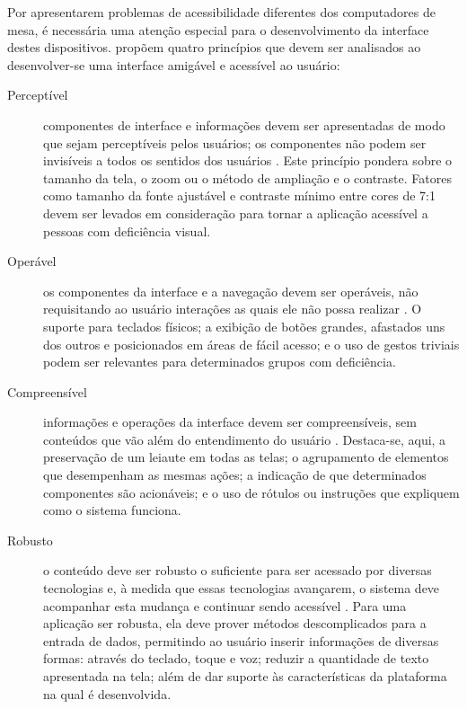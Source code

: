Por apresentarem problemas de acessibilidade diferentes dos computadores de mesa, é necessária uma atenção especial para o desenvolvimento da interface destes dispositivos. \cite{WCAG20} propõem quatro princípios que devem ser analisados ao desenvolver-se uma interface amigável e acessível ao usuário:
\begin{description}
    \item [Perceptível] componentes de interface e informações devem ser apresentadas de modo que sejam perceptíveis pelos usuários; os componentes não podem ser invisíveis a todos os sentidos dos usuários \cite{W3C20}. Este princípio pondera sobre o tamanho da tela, o zoom ou o método de ampliação e o contraste. Fatores como tamanho da fonte ajustável e contraste mínimo entre cores de 7:1 devem ser levados em consideração para tornar a aplicação acessível a pessoas com deficiência visual.
    \item [Operável] os componentes da interface e a navegação devem ser operáveis, não requisitando ao usuário interações as quais ele não possa realizar \cite{W3C20}. O suporte para teclados físicos; a exibição de botões grandes, afastados uns dos outros e posicionados em áreas de fácil acesso; e o uso de gestos triviais podem ser relevantes para determinados grupos com deficiência.
    \item [Compreensível] informações e operações da interface devem ser compreensíveis, sem conteúdos que vão além do entendimento do usuário \cite{W3C20}. Destaca-se, aqui, a preservação de um leiaute em todas as telas; o agrupamento de elementos que desempenham as mesmas ações; a indicação de que determinados componentes são acionáveis; e o uso de rótulos ou instruções que expliquem como o sistema funciona.
    \item [Robusto] o conteúdo deve ser robusto o suficiente para ser acessado por diversas tecnologias e, à medida que essas tecnologias avançarem, o sistema deve acompanhar esta mudança e continuar sendo acessível \cite{W3C20}. Para uma aplicação ser robusta, ela deve prover métodos descomplicados para a entrada de dados, permitindo ao usuário inserir informações de diversas formas: através do teclado, toque e voz; reduzir a quantidade de texto apresentada na tela; além de dar suporte às características da plataforma na qual é desenvolvida.
\end{description}

